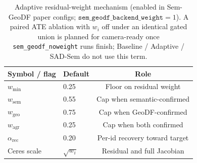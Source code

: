 \begin{table}[t]
\centering
\caption{Adaptive residual-weight mechanism (enabled in Sem-GeoDF paper
configs; \(\texttt{sem\_geodf\_backend\_weight}{=}1\)). A paired ATE ablation
with \(w_i\) off under an identical gated union is planned for camera-ready
once \texttt{sem\_geodf\_noweight} runs finish; Baseline / Adaptive / SAD-Sem
do not use this term.}
\label{tab:ablation_weight}
\setlength{\tabcolsep}{4pt}
\begin{tabular}{llc}
\toprule
Symbol / flag & Default & Role \\
\midrule
\(w_{\min}\) & 0.25 & Floor on residual weight \\
\(w_{\mathrm{sem}}\) & 0.55 & Cap when semantic-confirmed \\
\(w_{\mathrm{geo}}\) & 0.75 & Cap when GeoDF-confirmed \\
\(w_{\mathrm{agr}}\) & 0.25 & Cap when both confirmed \\
\(\alpha_{\mathrm{rec}}\) & 0.20 & Per-id recovery toward target \\
Ceres scale & \(\sqrt{w_i}\) & Residual and full Jacobian \\
\bottomrule
\end{tabular}
\end{table}

